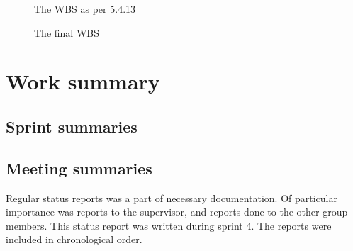 \begin{appendices}
\begin{figure}[p]
\setlength\fboxsep{0pt}
\setlength\fboxrule{1pt}\noindent{}
\caption{The WBS as per 5.4.13}
\label{fig:WBS54}
\end{figure}

\begin{figure}[p]
\setlength\fboxsep{0pt}
\setlength\fboxrule{1pt}\noindent{}
\caption{The final WBS}
\label{fig:WBSfin}
\end{figure}


\chapter{Work summary}
\section{Sprint summaries}
\label{tab:sprintList}

\section{Meeting summaries}
Regular status reports was a part of necessary documentation. Of particular importance was reports to the supervisor, and reports done to the other group members. This status report was written during sprint 4. The reports were included in chronological order.



\end{appendices}
